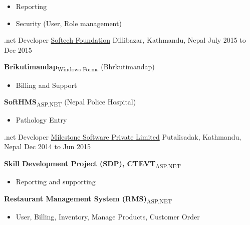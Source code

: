 \begin{cventries}
{\begin{cvitems}
		\begin{itemize}
			\item {Reporting}
			\item {Security (User, Role management)}
		\end{itemize}
	\end{cvitems}
}
  \cventry
    {.net Developer} %
    {\href{http://softechfoundation.com/}{Softech Foundation}} %
    {Dillibazar, Kathmandu, Nepal} %
    {July 2015 to Dec 2015} %
    {
    	\begin{cvitems} %
    		\item {\textbf{Brikutimandap}\textsubscript{Windows Forms} (Bhrkutimandap)}
    		\begin{itemize}
    			\item {Billing and Support}
    		\end{itemize}
    		\item {\textbf{SoftHMS}\textsubscript{ASP.NET} (Nepal Police Hospital)}
    		\begin{itemize}
    			\item {Pathology Entry}
    		\end{itemize}
    	\end{cvitems}
    }
 
  \cventry
    {.net Developer} %
    {\href{http://milestonesoftware.com.np/}{Milestone Software Private Limited}} %
    {Putalisadak, Kathmandu, Nepal} %
    {Dec 2014 to Jun 2015} %
    {
      \begin{cvitems} %
        \item \textbf{\href{http://202.45.144.216/}{Skill Development Project (SDP), CTEVT}}\textsubscript{ASP.NET}
        \begin{itemize}
        \item {Reporting and supporting}
        \end{itemize}
        \item \textbf{Restaurant Management System (RMS)}\textsubscript{ASP.NET}
        \begin{itemize}
        \item {User, Billing, Inventory, Manage Products, Customer Order}
        \end{itemize}
      \end{cvitems}
    }


\end{cventries}
